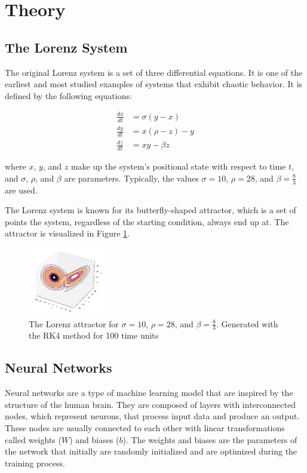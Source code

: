 \documentclass[11pt]{article}
\begin{document}
\section{Theory}

\subsection{The Lorenz System}

The original Lorenz system is a set of three differential equations. It is one of the earliest and most studied examples of systems that exhibit chaotic behavior. It is defined by the following equations:

\begin{align}
\frac{dx}{dt} &= \sigma(y - x) \\
\frac{dy}{dt} &= x(\rho - z) - y \\
\frac{dz}{dt} &= xy - \beta z
\end{align}

where $x$, $y$, and $z$ make up the system's positional state with respect to time $t$, and $\sigma$, $\rho$, and $\beta$ are parameters. Typically, the values $\sigma = 10$, $\rho = 28$, and $\beta = \frac{8}{3}$ are used.

The Lorenz system is known for its butterfly-shaped attractor, which is a set of points the system, regardless of the starting condition, always end up at. The attractor is visualized in Figure \ref{fig:lorenz_attractor}.

\begin{figure}[h]
\centering
\includegraphics[width=0.3\textwidth]{lorenz_attractor.jpeg}
\caption{The Lorenz attractor for $\sigma = 10$, $\rho = 28$, and $\beta = \frac{8}{3}$. Generated with the RK4 method for 100 time units}
\label{fig:lorenz_attractor}
\end{figure}

\subsection{Neural Networks}

Neural networks are a type of machine learning model that are inspired by the structure of the human brain. They are composed of layers with interconnected nodes, which represent neurons, that process input data and produce an output. These nodes are usually connected to each other with linear transformations called weights (\(W\)) and biases (\(b\)). The weights and biases are the parameters of the network that initially are randomly initialized and are optimized during the training process. \\
\end{document}
